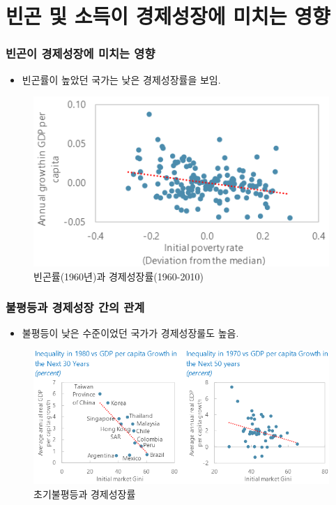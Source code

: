 \documentclass[handout, 10pt]{beamer}
\begin{document}
\section{빈곤 및 소득이 경제성장에 미치는 영향}

\begin{frame}[<+->]
\frametitle{빈곤이 경제성장에 미치는 영향}
    \begin{itemize}
        \item 빈곤률이 높았던 국가는 낮은 경제성장률을 보임. 
    \end{itemize}
    \begin{figure}[htpb]
        \begin{center}
            \caption{빈곤률(1960년)과 경제성장률(1960-2010)}
            \includegraphics[scale=0.5]{pic/Growth in GDP per capita vs Initial Poverty.png}
        \end{center}
    \end{figure}
\end{frame}

\begin{frame}[<+->]
\frametitle{불평등과 경제성장 간의 관계}
    \begin{itemize}
        \item 불평등이 낮은 수준이었던 국가가 경제성장룰도 높음.
    \end{itemize}
    \begin{figure}[htpb]
        \begin{center}
            \caption{초기불평등과 경제성장률}
            \includegraphics[scale=0.5]{pic/Growth in GDP per capita vs Initial Inequality.png}
        \end{center}
    \end{figure}
\end{frame}
\end{document}
